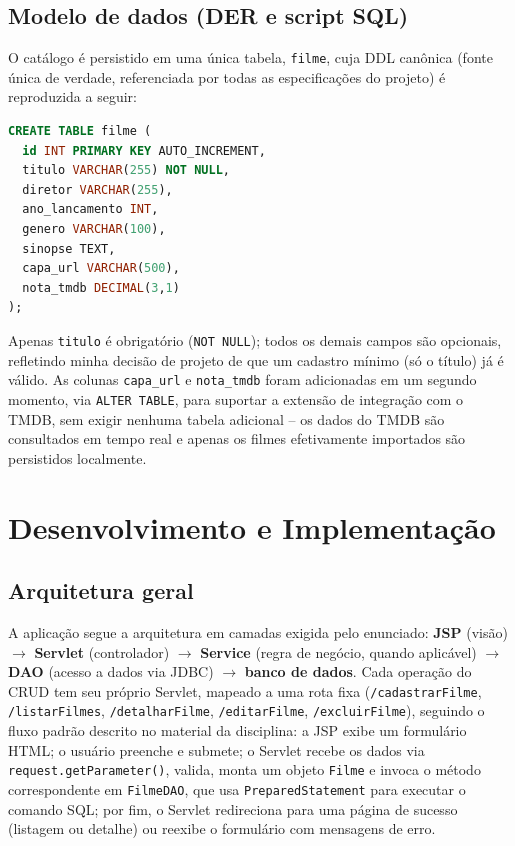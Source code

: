 \documentclass[12pt,a4paper]{article}
\begin{document}
\subsection{Modelo de dados (DER e script SQL)}

O catálogo é persistido em uma única tabela, \texttt{filme}, cuja DDL canônica (fonte única de
verdade, referenciada por todas as especificações do projeto) é reproduzida a seguir:

\begin{lstlisting}[language=SQL, caption={DDL canônica da tabela \textit{filme} (\texttt{docs/modelagem/der.sql})}, label={lst:der}]
CREATE TABLE filme (
  id INT PRIMARY KEY AUTO_INCREMENT,
  titulo VARCHAR(255) NOT NULL,
  diretor VARCHAR(255),
  ano_lancamento INT,
  genero VARCHAR(100),
  sinopse TEXT,
  capa_url VARCHAR(500),
  nota_tmdb DECIMAL(3,1)
);
\end{lstlisting}

Apenas \texttt{titulo} é obrigatório (\texttt{NOT NULL}); todos os demais campos são opcionais,
refletindo minha decisão de projeto de que um cadastro mínimo (só o título) já é válido. As
colunas \texttt{capa\_url} e \texttt{nota\_tmdb} foram adicionadas em um segundo momento, via
\texttt{ALTER TABLE}, para suportar a extensão de integração com o TMDB, sem exigir nenhuma
tabela adicional -- os dados do TMDB são consultados em tempo real e apenas os filmes efetivamente
importados são persistidos localmente.

\section{Desenvolvimento e Implementação}
\label{sec:desenvolvimento}

\subsection{Arquitetura geral}

A aplicação segue a arquitetura em camadas exigida pelo enunciado: \textbf{JSP} (visão) $\to$
\textbf{Servlet} (controlador) $\to$ \textbf{Service} (regra de negócio, quando aplicável)
$\to$ \textbf{DAO} (acesso a dados via JDBC) $\to$ \textbf{banco de dados}. Cada operação do CRUD
tem seu próprio Servlet, mapeado a uma rota fixa (\texttt{/cadastrarFilme},
\texttt{/listarFilmes}, \texttt{/detalharFilme}, \texttt{/editarFilme}, \texttt{/excluirFilme}),
seguindo o fluxo padrão descrito no material da disciplina: a JSP exibe um formulário HTML; o
usuário preenche e submete; o Servlet recebe os dados via \texttt{request.getParameter()},
valida, monta um objeto \texttt{Filme} e invoca o método correspondente em \texttt{FilmeDAO}, que
usa \texttt{PreparedStatement} para executar o comando SQL; por fim, o Servlet redireciona para
uma página de sucesso (listagem ou detalhe) ou reexibe o formulário com mensagens de erro.
\end{document}
